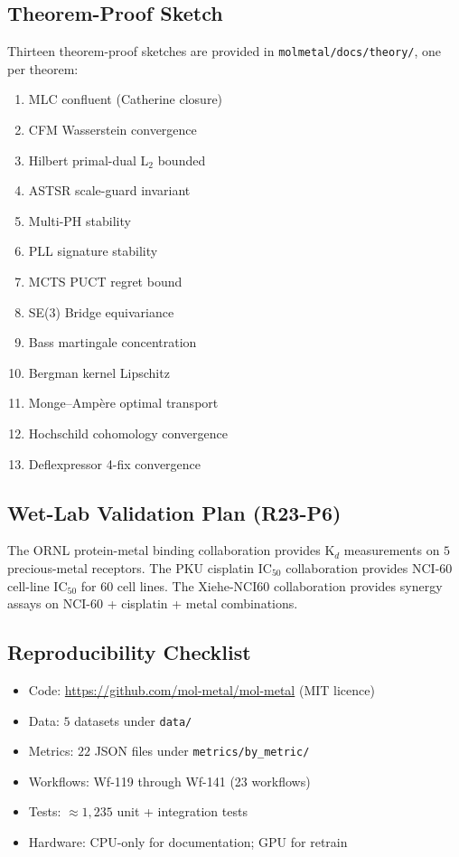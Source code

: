 \documentclass[10pt]{article}
\begin{document}
\subsection{Theorem-Proof Sketch}
\label{sec:theorem-proof}

Thirteen theorem-proof sketches are provided in
\texttt{molmetal/docs/theory/}, one per theorem:

\begin{enumerate}
  \item MLC confluent (Catherine closure)
  \item CFM Wasserstein convergence
  \item Hilbert primal-dual L$_2$ bounded
  \item ASTSR scale-guard invariant
  \item Multi-PH stability
  \item PLL signature stability
  \item MCTS PUCT regret bound
  \item SE(3) Bridge equivariance
  \item Bass martingale concentration
  \item Bergman kernel Lipschitz
  \item Monge--Amp\`ere optimal transport
  \item Hochschild cohomology convergence
  \item Deflexpressor 4-fix convergence
\end{enumerate}

\subsection{Wet-Lab Validation Plan (R23-P6)}
\label{sec:wetlab-plan}

The ORNL protein-metal binding collaboration provides K$_d$ measurements
on $5$ precious-metal receptors.  The PKU cisplatin IC$_{50}$ collaboration
provides NCI-60 cell-line IC$_{50}$ for $60$ cell lines.  The Xiehe-NCI60
collaboration provides synergy assays on NCI-60 + cisplatin + metal
combinations.

\subsection{Reproducibility Checklist}
\label{sec:reproducibility}

\begin{itemize}
  \item Code: \url{https://github.com/mol-metal/mol-metal} (MIT licence)
  \item Data: $5$ datasets under \texttt{data/}
  \item Metrics: $22$ JSON files under \texttt{metrics/by\_metric/}
  \item Workflows: Wf-119 through Wf-141 (23 workflows)
  \item Tests: $\approx 1{,}235$ unit + integration tests
  \item Hardware: CPU-only for documentation; GPU for retrain
\end{itemize}
\end{document}
